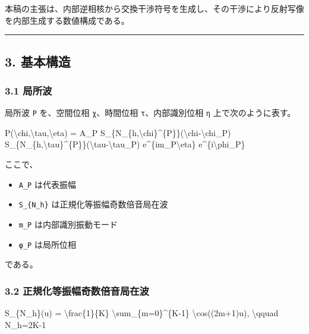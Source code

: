 \documentclass[
  a4paper,
]{article}
\newenvironment{Shaded}{}{}
\newcommand{\NormalTok}[1]{#1}
\providecommand{\tightlist}{%
  \setlength{\itemsep}{0pt}\setlength{\parskip}{0pt}}
\begin{document}
本稿の主張は、内部逆相核から交換干渉符号を生成し、その干渉により反射写像を内部生成する数値構成である。

\begin{center}\rule{0.5\linewidth}{0.5pt}\end{center}

\subsection{3. 基本構造}\label{ux57faux672cux69cbux9020}

\subsubsection{3.1 局所波}\label{ux5c40ux6240ux6ce2}

局所波 \texttt{P} を、空間位相 \texttt{χ}、時間位相
\texttt{τ}、内部識別位相 \texttt{η} 上で次のように表す。

\begin{Shaded}
\begin{Highlighting}[]
\NormalTok{P(\textbackslash{}chi,\textbackslash{}tau,\textbackslash{}eta)}
\NormalTok{=}
\NormalTok{A\_P}
\NormalTok{S\_\{N\_\{h,\textbackslash{}chi\}\^{}\{P\}\}(\textbackslash{}chi{-}\textbackslash{}chi\_P)}
\NormalTok{S\_\{N\_\{h,\textbackslash{}tau\}\^{}\{P\}\}(\textbackslash{}tau{-}\textbackslash{}tau\_P)}
\NormalTok{e\^{}\{im\_P\textbackslash{}eta\}}
\NormalTok{e\^{}\{i\textbackslash{}phi\_P\}}
\end{Highlighting}
\end{Shaded}

ここで、

\begin{itemize}
\tightlist
\item
  \texttt{A\_P} は代表振幅
\item
  \texttt{S\_\{N\_h\}} は正規化等振幅奇数倍音局在波
\item
  \texttt{m\_P} は内部識別振動モード
\item
  \texttt{φ\_P} は局所位相
\end{itemize}

である。

\subsubsection{3.2
正規化等振幅奇数倍音局在波}\label{ux6b63ux898fux5316ux7b49ux632fux5e45ux5947ux6570ux500dux97f3ux5c40ux5728ux6ce2}

\begin{Shaded}
\begin{Highlighting}[]
\NormalTok{S\_\{N\_h\}(u)}
\NormalTok{=}
\NormalTok{\textbackslash{}frac\{1\}\{K\}}
\NormalTok{\textbackslash{}sum\_\{m=0\}\^{}\{K{-}1\}}
\NormalTok{\textbackslash{}cos((2m+1)u),}
\NormalTok{\textbackslash{}qquad}
\NormalTok{N\_h=2K{-}1}
\end{Highlighting}
\end{Shaded}
\end{document}

